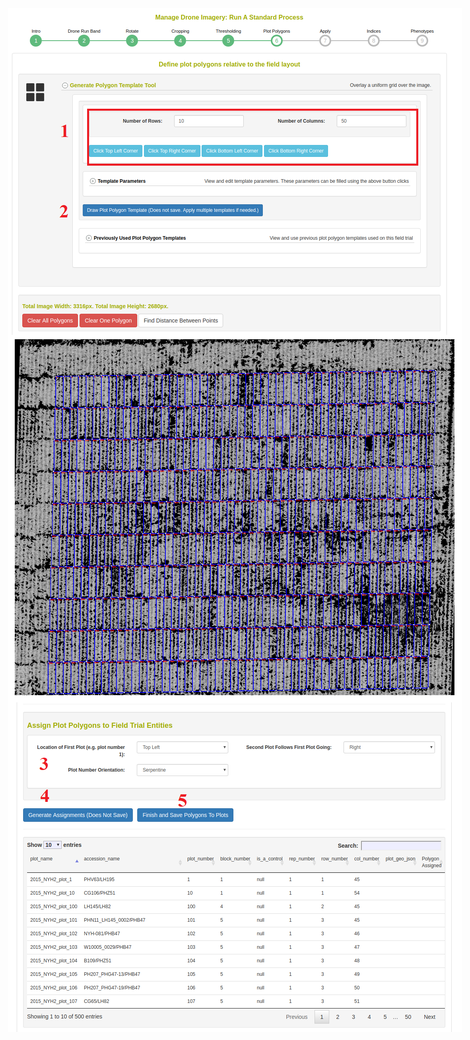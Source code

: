 \documentclass[
  12pt,
]{book}
\begin{document}
\begin{center}\includegraphics[width=0.95\linewidth]{assets/images/manage_image_phenotyping_standard_process_plot_polygon} \end{center}
\end{document}
